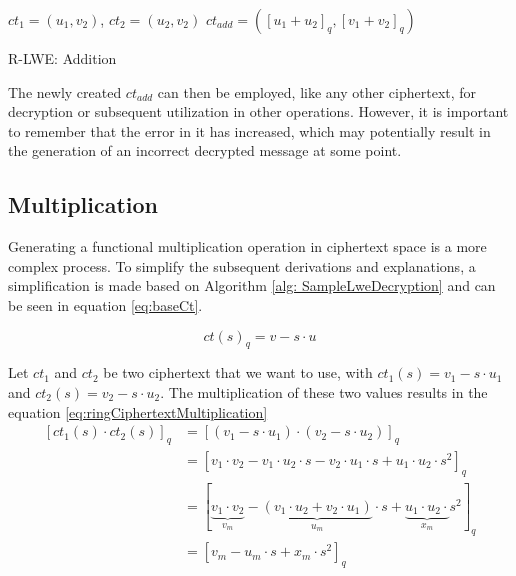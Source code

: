 \begin{algorithm}[htb]
  \begin{algorithmic}[1]
    \REQUIRE $ct_1 = (u_1, v_2)$, $ct_2 = (u_2, v_2)$
    \RETURN $ct_{add} = ([u_1 + u_2]_q, [v_1 + v_2]_q)$
  \end{algorithmic}
  \caption{R-LWE: Addition}
  \label{alg:RlweAddition}
\end{algorithm}

The newly created $ct_{add}$ can then be employed, like any other ciphertext, for decryption or subsequent utilization in other operations. However, it is important to remember that the error in it has increased, which may potentially result in the generation of an incorrect decrypted message at some point.

\subsection*{Multiplication}

Generating a functional multiplication operation in ciphertext space is a more complex process. To simplify the subsequent derivations and explanations, a simplification is made based on Algorithm \ref{alg: SampleLweDecryption} and can be seen in equation \ref{eq:baseCt}.

\begin{equation}
  ct(s)_q = v-s\cdot u
  \label{eq:baseCt}
\end{equation}

Let $ct_1$ and $ct_2$ be two ciphertext that we want to use, with $ct_1(s) = v_1-s\cdot u_1$ and $ct_2(s) = v_2-s\cdot u_2$. The multiplication of these two values results in the equation \ref{eq:ringCiphertextMultiplication}
\begin{equation}
  \begin{split}
    [ct_1(s)\cdot ct_2(s)]_q & = [(v_1-s\cdot u_1) \cdot (v_2-s\cdot u_2)]_q                                                                                              \\
                             & = [v_1\cdot v_2 - v_1\cdot u_2 \cdot s- v_2\cdot u_1\cdot s + u_1\cdot u_2\cdot s^2]_q                                                     \\
                             & = [\underbrace{v_1\cdot v_2}_{v_m} - \underbrace{(v_1\cdot u_2 + v_2\cdot u_1)}_{u_m}\cdot s + \underbrace{u_1\cdot u_2\cdot}_{x_m} s^2]_q \\
                             & = [v_m - u_m\cdot s + x_m \cdot s^2]_q
  \end{split}
  \label{eq:ringCiphertextMultiplication}
\end{equation}

